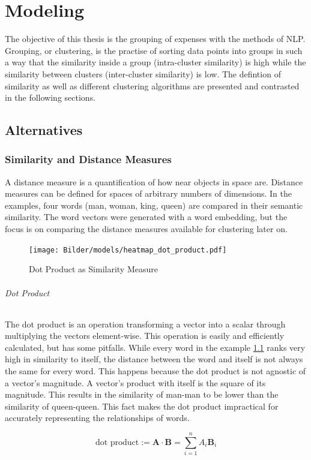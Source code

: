 \chapter{Modeling}
The objective of this thesis is the grouping of expenses with the methods of \ac{NLP}. Grouping, or clustering, is the practise of sorting data points into groups in such a way that the similarity inside a group (intra-cluster similarity) is high while the similarity between clusters (inter-cluster similarity) is low. The defintion of similarity as well as different clustering algorithms are presented and contrasted in the following sections.


\section{Alternatives}
\subsection{Similarity and Distance Measures}
A distance measure is a quantification of how near objects in space are. Distance measures can be defined for spaces of arbitrary numbers of dimensions. In the examples, four words (man, woman, king, queen) are compared in their semantic similarity. The word vectors were generated with a word embedding, but the focus is on comparing the distance measures available for clustering later on.

		\begin{figure}[!h]
			\centering
			\texttt{[image: Bilder/models/heatmap\_dot\_product.pdf]}
			\caption{Dot Product as Similarity Measure}
			\label{fig:dotproduct-heatmap}
		\end{figure}
	
		\subparagraph{Dot Product}
		The dot product is an operation transforming a vector into a scalar through multiplying the vectors element-wise. This operation is easily and efficiently calculated, but has some pitfalls.
		While every word in the example \ref{fig:dotproduct-heatmap} ranks very high in similarity to itself, the distance between the word and itself is not always the same for every word. This happens because the dot product is not agnostic of a vector's magnitude. A vector's product with itself is the square of its magnitude. This results in the similarity of man-man to be lower than the similarity of queen-queen.
		This fact makes the dot product impractical for accurately representing the relationships of words.
	
					\[ 
				\text{dot product} :=  \mathbf{A} \cdot \mathbf{B}= \sum\limits_{i=1}^{n}{A_i  \mathbf{B}_i} 
				\]

